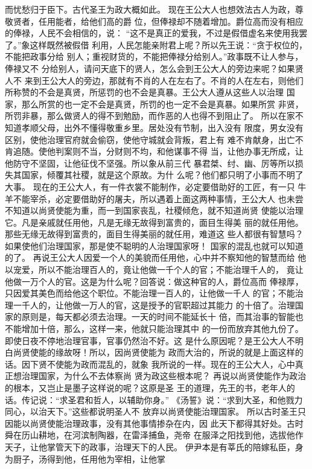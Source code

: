 \documentclass[12pt,UTF8]{ctexbook}
\begin{document}
而忧愁归于臣下。古代圣王为政大概如此。 
现在王公大人也想效法古人为政，尊敬贤者，任用能者，给他们高的爵 
位，但俸禄却不随着增加。爵位高而没有相应的俸禄，人民不会相信的，说： 
“这不是真正的爱我，不过是假借虚名来使用我罢了。”象这样既然被假借 
利用，人民怎能亲附君上呢？所以先王说：“贪于权位的，不能把政事分给 
别人；重视财货的，不能把俸禄分给别人。”政事既不让人参与，俸禄又不 
分给别人，请问天底下的贤人，怎么会到王公大人的旁边来呢？如果贤人不 
来到王公大人的旁边，那就有不肖的人在左右了。不肖的人在左右，则他们 
所称赞的不会是真贤，所惩罚的也不会是真暴。王公大人遵从这些人以治理 
国家，那么所赏的也一定不会是真贤，所罚的也一定不会是真暴。如果所赏 
非贤，所罚非暴，那么做贤人的得不到勉励，而作恶的人也得不到阻止了。 
所以在家不知道孝顺父母，出外不懂得敬重乡里。居处没有节制，出入没有 
限度，男女没有区别，使他治理官府就会偷窃，使他守城就会背叛，君上有 
难不肯献身，出亡不肯追随。使他判案则不当，分财则不均，和他谋事不得 
当，让他办事无所成，让他防守不坚固，让他征伐不坚强。所以象从前三代 
暴君桀、纣、幽、厉等所以损失其国家，倾覆其社稷，就是这个原故。为什 
么呢？他们都只明了小事而不明了大事。 
现在的王公大人，有一件衣裳不能制作，必定要借助好的工匠，有一只 
牛羊不能宰杀，必定要借助好的屠夫，所以遇着上面这两种事情，王公大人 
也未尝不知道以尚贤使能为重，而一到国家丧乱，社稷倾危，就不知道尚贤 
使能以治理它。凡是亲戚就任用他，凡是无缘无故得到富贵的，面目生得美 
丽的就任用他。那些无缘无故得到富贵的，面目生得美丽的就任用，难道这 
些人都很有智慧吗？如果使他们治理国家，那是使不聪明的人治理国家呀！ 
国家的混乱也就可以知道的了。 
再说王公大人因爱一个人的美貌而任用他，心中并不察知他的智慧而给 
他以宠爱，所以不能治理百人的，竟让他做一千个人的官；不能治理千人的， 
竟让他做一万个人的官。这是为什么呢？回答说：做这种官的人，爵位高而 
俸禄厚，只因爱其美色而给他这个职位。不能治理一百人的，让他做一千人 
的官；不能治理一千人的，让他做一万人的官，这是授予的官职超过其能力 
的十倍了。治理国家的原则是，每天都必须去治理。一天的时间不能延长十 
倍，而其治事的智能也不能增加十倍，那么，这样一来，他就只能治理其中 
的一份而放弃其他九份了。即使日夜不停地治理官事，官事仍然治不好。这 
是什么原因呢？是王公大人不明白尚贤使能的缘故呀！所以，因尚贤使能为 
政而大治的，所说的就是上面这样的话。因下贤不使能为政而混乱的，就象 
我所说的一样。现在的王公大人，心中真正想治理国家，为什么不去体察尚 
贤为政这些根本呢？ 
再说以尚贤使能作为政治的根本，又岂止是墨子这样说的呢？这原是圣 
王的道理，先王的书，老年人的话。传记说：“求圣君和哲人，以辅助你身。” 
《汤誓》说：“求到大圣，和他戮力同心，以治天下。”这些都说明圣人不 
放弃以尚贤使能治理国家。 
所以古时圣王只因能以尚贤使能治理政事，没有其他事情掺杂在内，因 
此天下都得其好处。古时舜在历山耕地，在河滨制陶器，在雷泽捕鱼，尧帝 
在服泽之阳找到他，选拔他作天子，让他掌管天下的政事，治理天下的人民。 
伊尹本是有莘氏的陪嫁私臣，身为厨子，汤得到他，任用他为宰相，让他掌 
\end{document}
